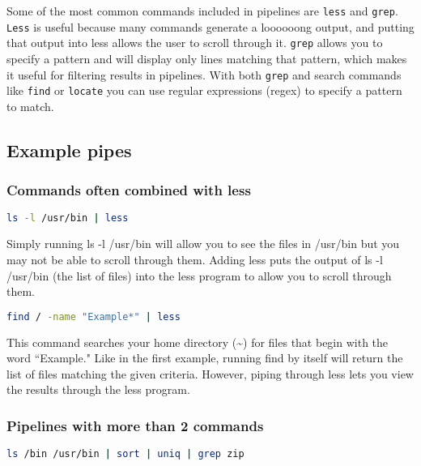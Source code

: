 \documentclass[11pt,a4paper]{article}
\begin{document}
Some of the most common commands included in pipelines are \verb|less| and \verb|grep|. \verb|Less| is useful because many commands generate a loooooong output, and putting that output into less allows the user to scroll through it. \verb|grep| allows you to specify a pattern and will display only lines matching that pattern, which makes it useful for filtering results in pipelines. With both \verb|grep| and search commands like \verb|find| or \verb|locate| you can use regular expressions (regex) to specify a pattern to match.


\subsection*{Example pipes}

\subsubsection*{Commands often combined with less}

\begin{lstlisting}[basicstyle=\ttfamily, backgroundcolor = \color{lightgray}, language = bash, xleftmargin = 0cm, framexleftmargin = 1em]
ls -l /usr/bin | less
\end{lstlisting}

Simply running ls -l /usr/bin will allow you to see the files in /usr/bin but you may not be able to scroll through them. Adding less puts the output of ls -l /usr/bin (the list of files) into the less program to allow you to scroll through them.

\begin{lstlisting}[basicstyle=\ttfamily, backgroundcolor = \color{lightgray}, language = bash, xleftmargin = 0cm, framexleftmargin = 1em]
find / -name "Example*" | less
\end{lstlisting}

This command searches your home directory (\textasciitilde) for files that begin with the word ``Example." Like in the first example, running find by itself will return the list of files matching the given criteria. However, piping through less lets you view the results through the less program.\\

\subsubsection*{Pipelines with more than 2 commands}

\begin{lstlisting}[basicstyle=\ttfamily, backgroundcolor = \color{lightgray}, language = bash, xleftmargin = 0cm, framexleftmargin = 1em]
ls /bin /usr/bin | sort | uniq | grep zip
\end{lstlisting}
\end{document}
